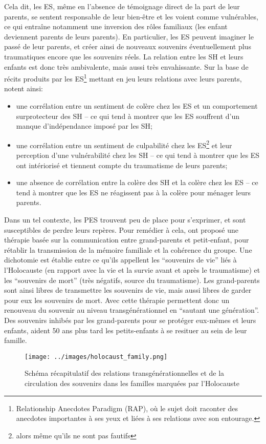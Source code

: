 \documentclass[french]{article}
\begin{document}
			Cela dit, les ES, même en l'absence de témoignage direct de la part de leur parents, se sentent responsable de leur bien-être et les voient comme vulnérables, ce qui entraîne notamment une inversion des rôles familiaux (les enfant deviennent parents de leurs parents). En particulier, les ES peuvent imaginer le passé de leur parents, et créer ainsi de nouveaux souvenirs éventuellement plus traumatiques encore que les souvenirs réels. La relation entre les SH et leurs enfants est donc très ambivalente, mais aussi très envahissante. Sur la base de récits produits par les ES\footnote{Relationship Anecdotes Paradigm (RAP), où le sujet doit raconter des anecdotes importantes à ses yeux et liées à ses relations avec son entourage.} mettant en jeu leurs relations avec leurs parents, \cite{wiseman2006} notent ainsi:
			\begin{itemize}
				\item une corrélation entre un sentiment de colère chez les ES et un comportement surprotecteur des SH -- ce qui tend à montrer que les ES souffrent d'un manque d'indépendance imposé par les SH;
				\item une corrélation entre un sentiment de culpabilité chez les ES\footnote{alors même qu'ils ne sont pas fautifs} et leur perception d'une vulnérabilité chez les SH -- ce qui tend à montrer que les ES ont intériorisé et tiennent compte du traumatisme de leurs parents;
				\item une absence de corrélation entre la colère des SH et la colère chez les ES -- ce tend à montrer que les ES ne réagissent pas à la colère pour ménager leurs parents.
			\end{itemize}\vspace{3mm}
			
			Dans un tel contexte, les PES trouvent peu de place pour s'exprimer, et sont susceptibles de perdre leurs repères. Pour remédier à cela, \cite{fossion2003} ont proposé une thérapie basée sur la communication entre grand-parents et petit-enfant, pour rétablir la transmission de la mémoire familiale et la cohérence du groupe. Une dichotomie est établie entre ce qu'ils appellent les ``souvenirs de vie'' liés à l'Holocauste (en rapport avec la vie et la survie avant et après le traumatisme) et les ``souvenirs de mort'' (très négatifs, source du traumatisme). Les grand-parents sont ainsi libres de transmettre les souvenirs de vie, mais aussi libres de garder pour eux les souvenirs de mort. Avec cette thérapie \cite{fossion2003} permettent donc un renouveau du souvenir au niveau transgénérationnel en ``sautant une génération''. Des souvenirs inhibés par les grand-parents pour se protéger eux-mêmes et leurs enfants, aident 50 ans plus tard les petits-enfants à se resituer au sein de leur famille.
			\begin{figure}[H]
				\centering
				\texttt{[image: ../images/holocaust\_family.png]}
				\caption{Schéma récapitulatif des relations transgénérationnelles et de la circulation des souvenirs dans les familles marquées par l'Holocauste}
			\end{figure}
			
\end{document}
